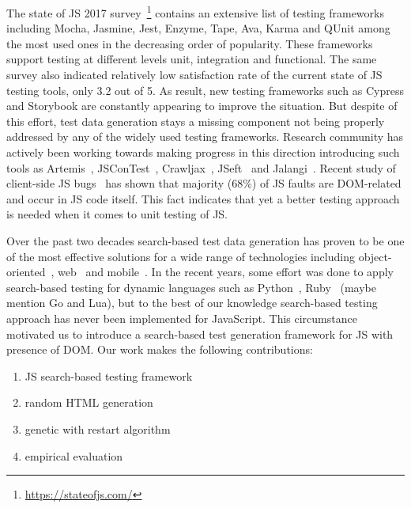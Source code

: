 \documentclass[sigconf,review, anonymous]{acmart}
\begin{document}


The state of JS 2017 survey~\footnote{\url{https://stateofjs.com/}} contains an extensive list of testing frameworks including Mocha, Jasmine, Jest, Enzyme, Tape, Ava, Karma and QUnit among the most used ones in the decreasing order of popularity. These frameworks support testing at different levels unit, integration and functional. The same survey also indicated relatively low satisfaction rate of the current state of JS testing tools, only 3.2 out of 5. As result, new testing frameworks such as Cypress and Storybook are constantly appearing to improve the situation. But despite of this effort, test data generation stays a missing component not being properly addressed by any of the widely used testing frameworks. Research community has actively been working towards making progress in this direction introducing such tools as Artemis~\cite{artemis2011}, JSConTest~\cite{heidegger2010contract}, Crawljax~\cite{mesbah2012crawling}, JSeft~\cite{mirshokraie2015jseft} and Jalangi~\cite{sen2013jalangi}. Recent study of client-side JS bugs~\cite{ocariza2017study} has shown that majority (68\%) of JS faults are DOM-related and occur in JS code itself. This fact indicates that yet a better testing approach is needed when it comes to unit testing of JS.

Over the past two decades search-based test data generation has proven to be one of the most effective solutions for a wide range of technologies including object-oriented~\cite{paper}, web~\cite{paper} and mobile~\cite{paper}. In the recent years, some effort was done to apply search-based testing for dynamic languages such as Python~\cite{paper}, Ruby~\cite{paper} (maybe mention Go and Lua), but to the best of our knowledge search-based testing approach has never been implemented for JavaScript. This circumstance motivated us to introduce a search-based test generation framework for JS with presence of DOM. Our work makes the following contributions:
\begin{enumerate}
\item JS search-based testing framework
\item random HTML generation
\item genetic with restart algorithm
\item empirical evaluation 
\end{enumerate} 
\end{document}
